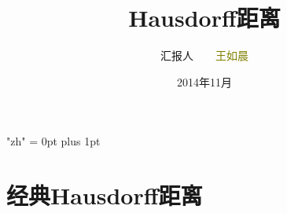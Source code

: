 \documentclass[notheorems,mathserif,table,compress]{beamer}  %
\begin{document}
\XeTeXlinebreaklocale "zh"         %
\XeTeXlinebreakskip = 0pt plus 1pt %
\begin{comment}
\AtBeginSection[]{                              %
  \frame<handout:0>{
    \frametitle{Content}\small
    \tableofcontents[current,currentsubsection]
  }
}
\AtBeginSubsection[]                            %
{
  \frame<handout:0>                             %
  {
    \frametitle{Contents}\small
    \tableofcontents[current,currentsubsection] %
  }
}
\end{comment}
\title[Hausdorff距离]{Hausdorff距离}
\author[wrc]{汇报人~~~~\textcolor{olive}{王如晨}}
\institute[ouc]{\small\textcolor{violet}{中国海洋大学~~~~信息科学与工程学院}}
\date{2014年11月}
\frame{ \titlepage }

\section{经典Hausdorff距离}

\end{document}
